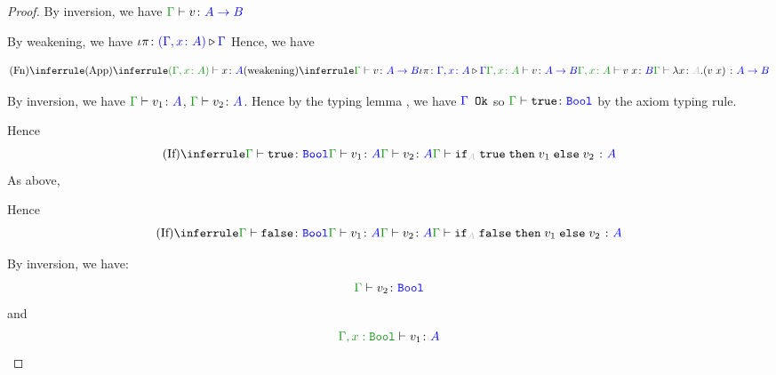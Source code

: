 \documentclass{report}
\begin{document}
\begin{framed}
\begin{proof}
            By inversion, we have $\gtyperelation{v}{\ab}$
        
            By weakening, we have $\iota\pi \colon {\color{blue}(\Gamma, x\colon A)} \triangleright {\color {blue} \Gamma}$
            Hence, we have
        
            \begin{equation}
                \ntreeruleI{Fn}{
                    \ntreeruleII{App}{
                        \typerelation{(\gax)}{x}{A}
                    }{
                        \ntreeruleII{weakening}{
                            \gtyperelation{v}{\ab}
                        }{
                            \wrel{\i\pi}{\gax}{\G}
                        }{
                            \typerelation{\gax}{v}{\ab}
                        }
                    } {
                        \typerelation{\gax}{\apply{v}{x}}{B}
                    }
                }{\gtyperelation{\lam{x}{A}{(\apply{v}{x})}}{\ab}}
            \end{equation}
        
                By inversion, we have $\gtyperelation{v_1}{ A}$, $\gtyperelation{v_2}{ A}$. Hence by the typing lemma , we have ${\color{blue} \Gamma} \texttt{ Ok}$ so $\gtyperelation{\t}{\B}$ by the axiom typing rule.
        
                Hence 
                \begin{equation}
                        \ntreeruleIII{If}{
                            \gtyperelation{\t}{\B}
                        }{
                            \gtyperelation{v_1}{ A}
                        }{
                            \gtyperelation{v_2}{ A}
                        }{
                            \gtyperelation{\pifthenelse{A}{\t}{v_1}{v_2}}{ A}
                        }
                \end{equation}
            As above,
        
            Hence 
            \begin{equation}
                \ntreeruleIII{If}{
                    \gtyperelation{\f}{\B}
                }{
                    \gtyperelation{v_1}{ A}
                }{
                    \gtyperelation{v_2}{ A}
                }{
                    \gtyperelation{\pifthenelse{A}{\f}{v_1}{v_2}}{ A}
                }
        \end{equation}
        
            By inversion, we have:
            \begin{equation}
                \gtyperelation{v_2}{\B}
            \end{equation}
            and
            \begin{equation}
                \typerelation{\G, x:\B}{v_1}{ A}
            \end{equation}
            

\end{proof}
\end{framed}
\end{document}
